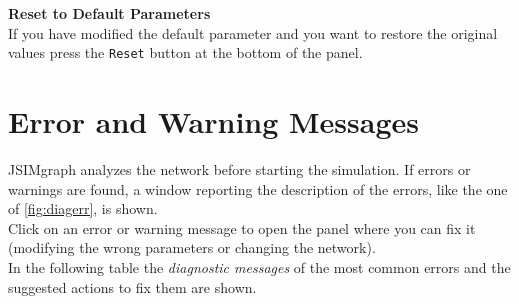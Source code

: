 \noindent \textbf{Reset to Default Parameters}\\
 If you have modified the
default parameter and you want to restore the original values
press the \texttt{Reset} button at the bottom of the panel.


\section{Error and Warning Messages}
\label{erwar}

JSIMgraph analyzes the network before starting the simulation. If
errors or warnings are found, a window reporting the description
of the errors, like the one of \autoref{fig:diagerr}, is shown.\\
Click on an error or warning message to open the panel where you
can fix it (modifying the wrong parameters or changing the network).\\
In the following table the \emph{diagnostic messages} of the most
common errors and the suggested actions to fix them are shown.

\pagebreak

